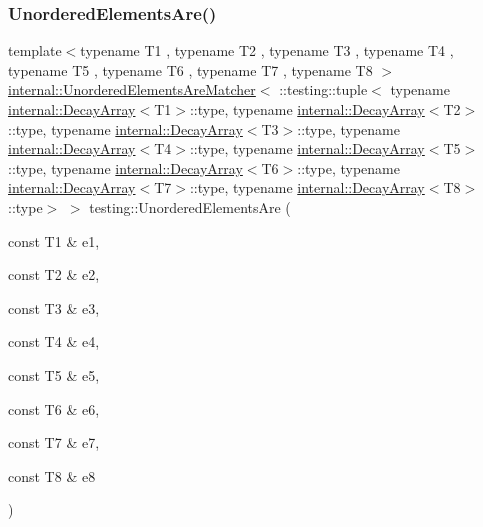 \subsubsection{\texorpdfstring{Unordered\+Elements\+Are()}{UnorderedElementsAre()}\hspace{0.1cm}{\footnotesize\ttfamily [9/11]}}
{\footnotesize\ttfamily template$<$typename T1 , typename T2 , typename T3 , typename T4 , typename T5 , typename T6 , typename T7 , typename T8 $>$ \\
\hyperlink{classtesting_1_1internal_1_1_unordered_elements_are_matcher}{internal\+::\+Unordered\+Elements\+Are\+Matcher}$<$ \+::testing\+::tuple$<$ typename \hyperlink{structtesting_1_1internal_1_1_decay_array}{internal\+::\+Decay\+Array}$<$T1$>$\+::type, typename \hyperlink{structtesting_1_1internal_1_1_decay_array}{internal\+::\+Decay\+Array}$<$T2$>$\+::type, typename \hyperlink{structtesting_1_1internal_1_1_decay_array}{internal\+::\+Decay\+Array}$<$T3$>$\+::type, typename \hyperlink{structtesting_1_1internal_1_1_decay_array}{internal\+::\+Decay\+Array}$<$T4$>$\+::type, typename \hyperlink{structtesting_1_1internal_1_1_decay_array}{internal\+::\+Decay\+Array}$<$T5$>$\+::type, typename \hyperlink{structtesting_1_1internal_1_1_decay_array}{internal\+::\+Decay\+Array}$<$T6$>$\+::type, typename \hyperlink{structtesting_1_1internal_1_1_decay_array}{internal\+::\+Decay\+Array}$<$T7$>$\+::type, typename \hyperlink{structtesting_1_1internal_1_1_decay_array}{internal\+::\+Decay\+Array}$<$T8$>$\+::type$>$ $>$ testing\+::\+Unordered\+Elements\+Are (\begin{DoxyParamCaption}\item[{const T1 \&}]{e1,  }\item[{const T2 \&}]{e2,  }\item[{const T3 \&}]{e3,  }\item[{const T4 \&}]{e4,  }\item[{const T5 \&}]{e5,  }\item[{const T6 \&}]{e6,  }\item[{const T7 \&}]{e7,  }\item[{const T8 \&}]{e8 }\end{DoxyParamCaption})\hspace{0.3cm}{\ttfamily [inline]}}

\mbox{\label{namespacetesting_a2e03e363e193ef512bf9fa964c484375}} 
